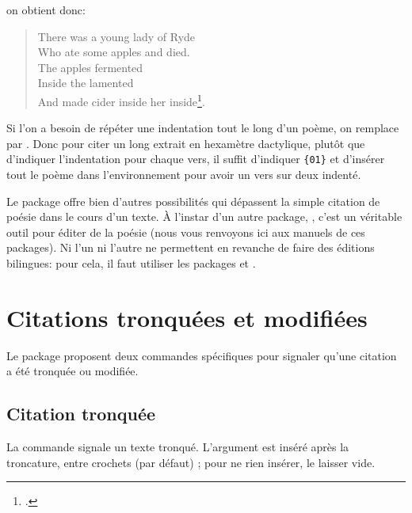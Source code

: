 on obtient donc:
  
\begin{verse} 

 \begin{patverse} 

\vin There was a young lady of Ryde \\
 Who ate some apples and died.  \\
 The apples fermented \\
 Inside the lamented \\
 And made cider inside her inside\footcite{EdwardLear}. 

\end{patverse}  \end{verse} 
 
 Si l'on a besoin de répéter une indentation tout le long d'un poème, on remplace  par . Donc pour citer un long extrait en hexamètre dactylique, plutôt que d'indiquer l'indentation pour chaque vers, il suffit  d'indiquer \verb|{01}| et d'insérer tout le poème  dans l'environnement  pour avoir un vers sur deux indenté.
 
 
 Le package  offre bien d'autres possibilités qui dépassent la simple citation de poésie dans le cours d'un texte. À l'instar d'un autre package, , c'est un véritable outil pour éditer de la poésie (nous vous renvoyons ici aux manuels de ces packages). Ni l'un ni l'autre ne permettent en revanche de faire des éditions bilingues: pour cela, il faut utiliser les packages  et . 


\section{Citations tronquées et modifiées}

Le package  proposent deux commandes spécifiques pour signaler qu'une citation a été tronquée ou modifiée.

\subsection{Citation tronquée}

La commande  signale un texte tronqué. L'argument  est inséré après la troncature, entre crochets (par défaut) ; pour ne rien insérer, le laisser vide.

